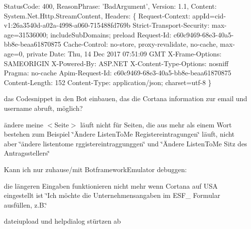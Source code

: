 \begin{DoxyCode}
StatusCode: 400, ReasonPhrase: 'BadArgument', Version: 1.1, Content: System.Net.Http.StreamContent,
       Headers:
\{
  Request-Context: appId=cid-v1:26a3540d-a02a-4998-a060-715488fd769b
  Strict-Transport-Security: max-age=31536000; includeSubDomains; preload
  Request-Id: c60c9469-68e3-40a5-bb8e-beaa61870875
  Cache-Control: no-store, proxy-revalidate, no-cache, max-age=0, private
  Date: Thu, 14 Dec 2017 07:51:09 GMT
  X-Frame-Options: SAMEORIGIN
  X-Powered-By: ASP.NET
  X-Content-Type-Options: nosniff
  Pragma: no-cache
  Apim-Request-Id: c60c9469-68e3-40a5-bb8e-beaa61870875
  Content-Length: 152
  Content-Type: application/json; charset=utf-8
\}
\end{DoxyCode}



\begin{DoxyItemize}
\item das Codesnippet in den Bot einbauen, das die Cortana information zur email und username abruft, möglich?
\item ändere meine $<$\+Seite$>$ läuft nicht für Seiten, die aus mehr als einem Wort bestehen zum Beispiel \char`\"{}Ändere Listen\+To\+Me Registereintragungen\char`\"{} läuft, nicht aber \char`\"{}ändere listentome rggistereintraggunggen\char`\"{} und \char`\"{}Ändere Listen\+To\+Me Sitz des Antragsstellers\char`\"{}
\end{DoxyItemize}

Kann ich nur zuhause/mit Botframework\+Emulator debuggen\+:
\begin{DoxyItemize}
\item die längeren Eingaben funktionieren nicht mehr wenn Cortana auf U\+SA eingestellt ist \char`\"{}\+Ich möchte die Unternehmensangaben im E\+S\+F\+\_ Formular ausfüllen, z.\+B.\char`\"{}
\item dateiupload und helpdialog stürtzen ab 
\end{DoxyItemize}